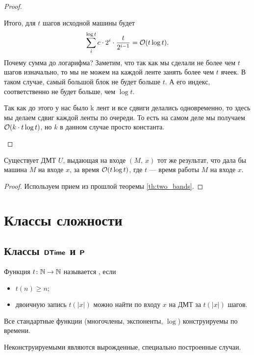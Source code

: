 \begin{proof}
\begin{itemize}
			Итого, для $ t$ шагов исходной машины будет
			\[
				\sum_{i}^{\log t}c\cdot 2^{i} \cdot \frac{t}{2^{i-1}} = \O(t \log t)
			.\]
			Почему сумма до логарифма? Заметим, что так как мы сделали не более чем $ t$ шагов изначально, то мы не можем на каждой ленте занять более чем $ t$ ячеек. В таком случае, самый большой блок не будет больше $ t$. А его индекс, соответственно не будет больше, чем $ \log t$.
			\begin{note}
			Так как до этого у нас было k лент и все сдвиги делались одновременно, то здесь мы делаем сдвиг каждой ленты по очереди. То есть на самом деле мы получаем $ \O(k \cdot t \log t)$, но $ k$ в данном случае просто константа.
			\end{note}
	\end{itemize}
\end{proof}

\begin{thm}[Об универсальной МТ]
	Существует ДМТ $ U$, выдающая на входе $(M, ~ x)$ тот же результат, что дала бы машина $ M$ на входе $ x$, за время $ \O(t \log t)$, где $ t $ --- время работы $ M$ на входе $ x$.
\end{thm}
\begin{proof}
	Используем прием из прошлой теоремы \ref{th:two_bands}.
\end{proof}

\section{Классы сложности}
\subsection{Классы $\DTIME$ и $\P$}

\begin{defn}
	Функция $ t\colon \N \to  \N$ называется , если
	\begin{itemize}[noitemsep]
		\item $ t(n) \ge n$;
		\item двоичную запись  $ t(\lvert x \rvert )$ можно найти по входу $ x$ на ДМТ за  $ t(\lvert x \rvert )$ шагов.
	\end{itemize}
\end{defn}

\begin{note}
    Все стандартные функции (многочлены, экспоненты, $ \log$) конструируемы по времени. 
    
    Неконструируемыми являются вырожденные, специально построенные случаи.
\end{note}

